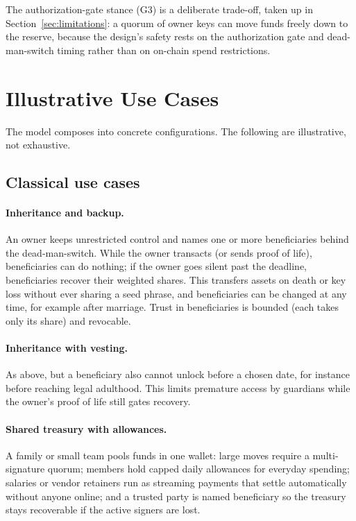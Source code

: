 \documentclass[11pt,DIV=11,parskip=half-]{scrartcl}
\begin{document}
\noindent The authorization-gate stance (G3) is a deliberate trade-off, taken up in Section~\ref{sec:limitations}: a quorum of owner keys can move funds freely down to the reserve, because the design's safety rests on the authorization gate and dead-man-switch timing rather than on on-chain spend restrictions.



\section{Illustrative Use Cases}
\label{sec:use-cases}

The model composes into concrete configurations. The following are illustrative, not exhaustive.

\subsection{Classical use cases}
\label{sub:classical-use-cases}

\paragraph{Inheritance and backup.} An owner keeps unrestricted control and names one or more beneficiaries behind the dead-man-switch. While the owner transacts (or sends proof of life), beneficiaries can do nothing; if the owner goes silent past the deadline, beneficiaries recover their weighted shares. This transfers assets on death or key loss without ever sharing a seed phrase, and beneficiaries can be changed at any time, for example after marriage. Trust in beneficiaries is bounded (each takes only its share) and revocable.

\paragraph{Inheritance with vesting.} As above, but a beneficiary also cannot unlock before a chosen date, for instance before reaching legal adulthood. This limits premature access by guardians while the owner's proof of life still gates recovery.

\paragraph{Shared treasury with allowances.} A family or small team pools funds in one wallet: large moves require a multi-signature quorum; members hold capped daily allowances for everyday spending; salaries or vendor retainers run as streaming payments that settle automatically without anyone online; and a trusted party is named beneficiary so the treasury stays recoverable if the active signers are lost.
\end{document}
